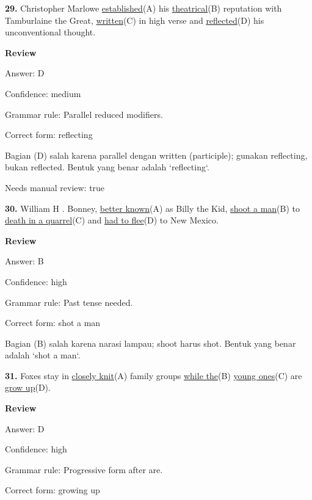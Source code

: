 \documentclass[12pt]{article}
\begin{document}
\endgroup
\par
\vspace{\questionblockgap}
\noindent\textbf{29.} Christopher Marlowe \uline{established}(A) his \uline{theatrical}(B) reputation with Tamburlaine the Great, \uline{written}(C) in high verse and \uline{reflected}(D) his unconventional thought.
\par
\begingroup
\setlength{\parskip}{0pt}
\setlength{\parindent}{0pt}
\textbf{Review}\par
Answer: D\par
Confidence: medium\par
Grammar rule: Parallel reduced modifiers.\par
Correct form: reflecting\par
Bagian (D) salah karena parallel dengan written (participle); gunakan reflecting, bukan reflected. Bentuk yang benar adalah `reflecting`.\par
Needs manual review: true\par
\endgroup
\par
\vspace{\questionblockgap}
\noindent\textbf{30.} William H . Bonney, \uline{better known}(A) as Billy the Kid, \uline{shoot a man}(B) to \uline{death in a quarrel}(C) and \uline{had to flee}(D) to New Mexico.
\par
\begingroup
\setlength{\parskip}{0pt}
\setlength{\parindent}{0pt}
\textbf{Review}\par
Answer: B\par
Confidence: high\par
Grammar rule: Past tense needed.\par
Correct form: shot a man\par
Bagian (B) salah karena narasi lampau; shoot harus shot. Bentuk yang benar adalah `shot a man`.\par
\endgroup
\par
\vspace{\questionblockgap}
\noindent\textbf{31.} Foxes stay in \uline{closely knit}(A) family groups \uline{while the}(B) \uline{young ones}(C) are \uline{grow up}(D).
\par
\begingroup
\setlength{\parskip}{0pt}
\setlength{\parindent}{0pt}
\textbf{Review}\par
Answer: D\par
Confidence: high\par
Grammar rule: Progressive form after are.\par
Correct form: growing up\par
\end{document}
